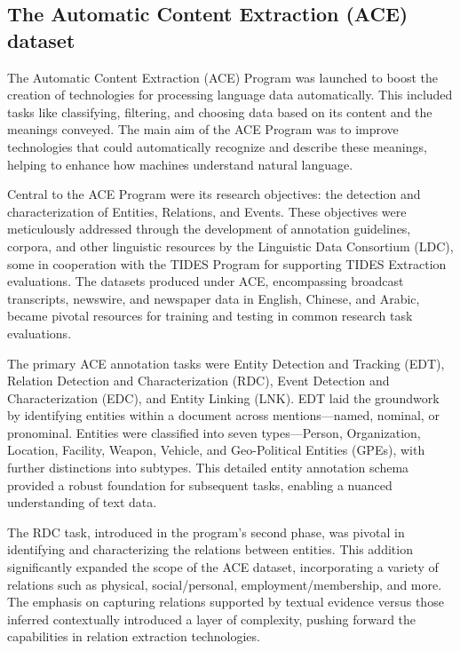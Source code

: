 \subsection{The Automatic Content Extraction (ACE) dataset}
\label{sec:acedataset}

The Automatic Content Extraction (ACE) Program was launched to boost the creation of technologies for processing language data automatically\cite{ACE}. This included tasks like classifying, filtering, and choosing data based on its content and the meanings conveyed. The main aim of the ACE Program was to improve technologies that could automatically recognize and describe these meanings, helping to enhance how machines understand natural language.

Central to the ACE Program were its research objectives: the detection and characterization of Entities, Relations, and Events. These objectives were meticulously addressed through the development of annotation guidelines, corpora, and other linguistic resources by the Linguistic Data Consortium (LDC), some in cooperation with the TIDES Program for supporting TIDES Extraction evaluations. The datasets produced under ACE, encompassing broadcast transcripts, newswire, and newspaper data in English, Chinese, and Arabic, became pivotal resources for training and testing in common research task evaluations.

The primary ACE annotation tasks were Entity Detection and Tracking (EDT), Relation Detection and Characterization (RDC), Event Detection and Characterization (EDC), and Entity Linking (LNK). EDT laid the groundwork by identifying entities within a document across mentions—named, nominal, or pronominal. Entities were classified into seven types—Person, Organization, Location, Facility, Weapon, Vehicle, and Geo-Political Entities (GPEs), with further distinctions into subtypes. This detailed entity annotation schema provided a robust foundation for subsequent tasks, enabling a nuanced understanding of text data.

The RDC task, introduced in the program's second phase, was pivotal in identifying and characterizing the relations between entities. This addition significantly expanded the scope of the ACE dataset, incorporating a variety of relations such as physical, social/personal, employment/membership, and more. The emphasis on capturing relations supported by textual evidence versus those inferred contextually introduced a layer of complexity, pushing forward the capabilities in relation extraction technologies.

